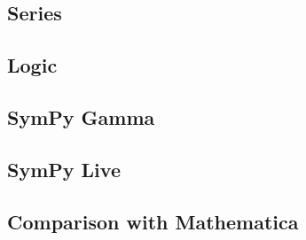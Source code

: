 \subsection{Series}



\subsection{Logic}


\subsection{SymPy Gamma}\label{sympy-gamma}



\subsection{SymPy Live}\label{sympy-live}



\subsection{Comparison with Mathematica}


